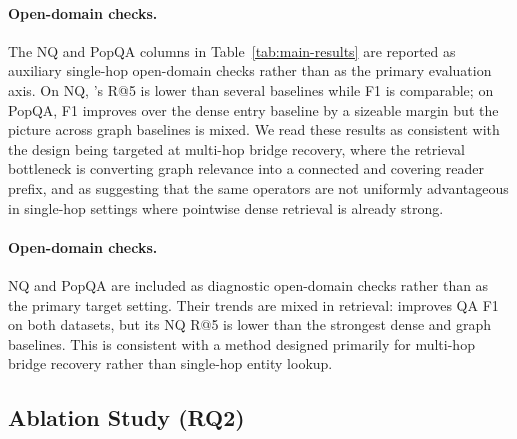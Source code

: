 \paragraph{Open-domain checks.}
The NQ and PopQA columns in Table~\ref{tab:main-results} are reported
as auxiliary single-hop open-domain checks rather than as the primary
evaluation axis. On NQ, \methodname{}'s R@5 is lower than several
baselines while F1 is comparable; on PopQA, F1 improves over the
dense entry baseline by a sizeable margin but the picture across
graph baselines is mixed. We read these results as consistent with the
design being targeted at multi-hop bridge recovery, where the
retrieval bottleneck is converting graph relevance into a connected
and covering reader prefix, and as suggesting that the same operators
are not uniformly advantageous in single-hop settings where pointwise
dense retrieval is already strong.

\paragraph{Open-domain checks.}
NQ and PopQA are included as diagnostic open-domain checks rather than
as the primary target setting. Their trends are mixed in retrieval:
\methodname{} improves QA F1 on both datasets, but its NQ R@5 is lower
than the strongest dense and graph baselines. This is consistent with a
method designed primarily for multi-hop bridge recovery rather than
single-hop entity lookup.

\subsection{Ablation Study (RQ2)}
\label{sec:experiments:ablation}

